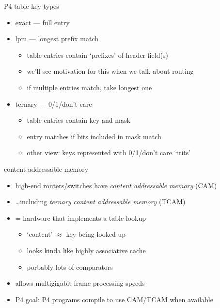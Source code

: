 \begin{frame}{P4 table key types}
    \begin{itemize}
    \item exact --- full entry
    \item lpm --- longest prefix match
        \begin{itemize}
        \item table entries contain `prefixes' of header field(s)
        \item we'll see motivation for this when we talk about routing
        \item if multiple entries match, take longest one
        \end{itemize}
    \item ternary --- 0/1/don't care
        \begin{itemize}
        \item table entries contain key and mask
        \item entry matches if bits included in mask match
        \item other view: keys represented with 0/1/don't care `trits'
        \end{itemize}
    \end{itemize}
\end{frame}

\begin{frame}{content-addressable memory}
    \begin{itemize}
    \item high-end routers/switches have \textit{content addressable memory} (CAM)
    \item \ldots including \textit{ternary content addressable memory} (TCAM)
    \vspace{.5cm}
    \item = hardware that implements a table lookup
        \begin{itemize}
        \item `content' $\approx$ key being looked up
        \item looks kinda like highly associative cache
        \item porbably lots of comparators
        \end{itemize}
    \item allows multigigabit frame processing speeds
    \item P4 goal: P4 programs compile to use CAM/TCAM when available
    \end{itemize}
\end{frame}

